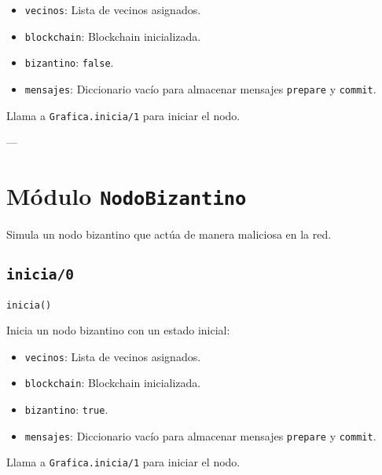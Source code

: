 {\begin{itemize}
    \item \texttt{vecinos}: Lista de vecinos asignados.
    \item \texttt{blockchain}: Blockchain inicializada.
    \item \texttt{bizantino}: \texttt{false}.
    \item \texttt{mensajes}: Diccionario vacío para almacenar mensajes \texttt{prepare} y \texttt{commit}.
\end{itemize}

Llama a \texttt{Grafica.inicia/1} para iniciar el nodo.

---

\section*{Módulo \texttt{NodoBizantino}}
Simula un nodo bizantino que actúa de manera maliciosa en la red.

\subsection*{\texttt{inicia/0}}
\begin{verbatim}
inicia()
\end{verbatim}

Inicia un nodo bizantino con un estado inicial:

\begin{itemize}
    \item \texttt{vecinos}: Lista de vecinos asignados.
    \item \texttt{blockchain}: Blockchain inicializada.
    \item \texttt{bizantino}: \texttt{true}.
    \item \texttt{mensajes}: Diccionario vacío para almacenar mensajes \texttt{prepare} y \texttt{commit}.
\end{itemize}

Llama a \texttt{Grafica.inicia/1} para iniciar el nodo.

}


